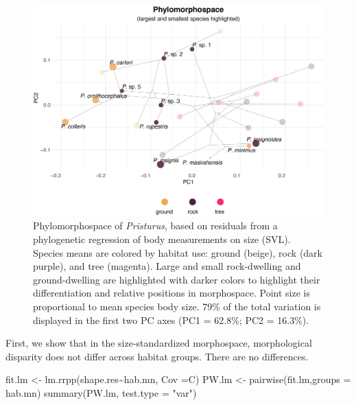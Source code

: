 \documentclass[
  11pt,
]{article}
\newenvironment{Shaded}{\begin{snugshade}}{\end{snugshade}}
\newcommand{\AttributeTok}[1]{\textcolor[rgb]{0.77,0.63,0.00}{#1}}
\newcommand{\FunctionTok}[1]{\textcolor[rgb]{0.00,0.00,0.00}{#1}}
\newcommand{\NormalTok}[1]{#1}
\newcommand{\OtherTok}[1]{\textcolor[rgb]{0.56,0.35,0.01}{#1}}
\newcommand{\SpecialCharTok}[1]{\textcolor[rgb]{0.00,0.00,0.00}{#1}}
\newcommand{\StringTok}[1]{\textcolor[rgb]{0.31,0.60,0.02}{#1}}
\begin{document}
\begin{figure}

{\centering \includegraphics[width=1\linewidth]{Figs/old_figures/figure_5_phylomorphospace_large_small} 

}

\caption{Phylomorphospace of \textit{Pristurus}, based on residuals from a phylogenetic regression of body measurements on size (SVL). Species means are colored by habitat use: ground (beige), rock (dark purple), and tree (magenta). Large and small rock-dwelling and ground-dwelling are highlighted with darker colors to highlight their differentiation and relative positions in morphospace. Point size is proportional to mean species body size. 79\% of the total variation is displayed in the first two PC axes (PC1 = 62.8\%; PC2 = 16.3\%).}\label{fig:unnamed-chunk-10}
\end{figure}

First, we show that in the size-standardized morphospace, morphological
disparity does not differ across habitat groups. There are no
differences.

\begin{Shaded}
\begin{Highlighting}[]
\NormalTok{fit.lm }\OtherTok{\textless{}{-}} \FunctionTok{lm.rrpp}\NormalTok{(shape.res}\SpecialCharTok{\textasciitilde{}}\NormalTok{hab.mn, }\AttributeTok{Cov =}\NormalTok{C)}
\NormalTok{PW.lm }\OtherTok{\textless{}{-}} \FunctionTok{pairwise}\NormalTok{(fit.lm,}\AttributeTok{groups =}\NormalTok{ hab.mn)}
\FunctionTok{summary}\NormalTok{(PW.lm, }\AttributeTok{test.type =} \StringTok{"var"}\NormalTok{)}
\end{Highlighting}
\end{Shaded}
\end{document}
